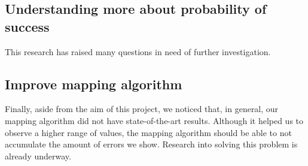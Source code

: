 \subsection{Understanding more about probability of success}
\label{sec:org37f3ade}

This research has raised many questions in need of further investigation.





\subsection{Improve mapping algorithm}
\label{sec:org36e47c9}

Finally, aside from the aim of this project, we noticed that, in general, our mapping algorithm did not have state-of-the-art results.
Although it helped us to observe a higher range of values, the mapping algorithm should be able to not accumulate the amount of errors we show.
Research into solving this problem is already underway.
